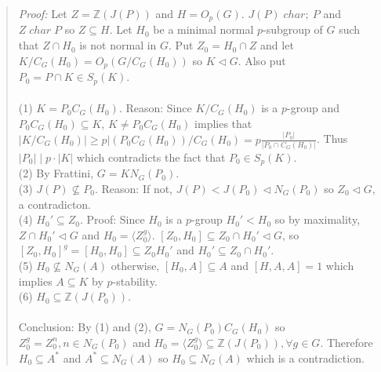 \begin{quote}
\emph{Proof:}
Let $Z= {\mathbb Z}(J(P))$ and $H= O_p(G)$.  $J(P) \; char ;\ P$ and $Z \; char \; P$ so
$Z \subseteq H$.  Let $H_0$ be a minimal normal $p$-subgroup of $G$ such that $Z \cap H_0$ is not
normal in $G$.  Put $Z_0= H_0 \cap Z$ and let $K/C_G(H_0)= O_p(G/C_G(H_0))$ so $K \lhd G$.
Also put $P_0=P \cap K \in S_p(K)$.
\\
\\
(1) $K= P_0 C_G(H_0)$. Reason: Since $K/C_G(H_0)$ is a $p$-group and $P_0C_G(H_0) \subseteq K$,
$K \ne P_0 C_G(H_0)$ implies that $|K/C_G(H_0)| \ge p |(P_0C_G(H_0))/C_G(H_0)= p {\frac {|P_0 |}
{|P_0 \cap C_G(H_0)|}}$. Thus $|P_0| \mid p \cdot |K|$ which contradicts the fact that
$P_0 \in S_p(K)$.
\\
(2)  By Frattini, $G= KN_G(P_0)$.
\\
(3) $J(P) \nsubseteq P_0$.  Reason: If not, $J(P) < J(P_0) \lhd N_G(P_0)$ so
$Z_0 \lhd G$, a contradicton.
\\
(4) $H_0' \subseteq Z_0$. Proof: Since $H_0$ is a $p$-group $H_0' < H_0$ so by
maximality, $Z \cap H_0' \lhd G$ and $H_0 = \langle Z_0^g \rangle $.  
$[Z_0, H_0] \subseteq Z_0 \cap H_0' \lhd G$,
so $[Z_0, H_0]^g = [H_0, H_0] \subseteq Z_0 H_0'$ and $H_0' \subseteq Z_0 \cap H_0'$.
\\
(5) $H_0 \nsubseteq N_G(A)$ otherwise, $[H_0,A] \subseteq A$ and
$[H,A,A]=1$ which implies $A \subseteq K$ by $p$-stability.
\\
(6)  $H_0 \subseteq {\mathbb Z}(J(P_0))$.
\\
\\
Conclusion:
By (1) and (2), $G= N_G(P_0) C_G(H_0)$ so $Z_0^g=Z_0^n, n \in N_G(P_0)$ and
$H_0= \langle Z_0^g \rangle \subseteq {\mathbb Z}(J(P_0)), \forall g \in G$.  Therefore
$H_0 \subseteq A^*$ and $A^* \subseteq N_G(A)$ so $H_0 \subseteq N_G(A)$ which is
a contradiction.
\end{quote}
